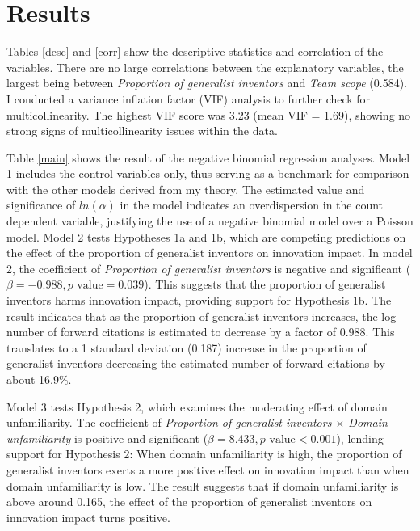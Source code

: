 \documentclass{article}
\begin{document}
\section{Results}

Tables \ref{desc} and \ref{corr} show the descriptive statistics and correlation of the variables. There are no large correlations between the explanatory variables, the largest being between \textit{Proportion of generalist inventors} and \textit{Team scope} (0.584). I conducted a variance inflation factor (VIF) analysis to further check for multicollinearity. The highest VIF score was 3.23 (mean VIF = 1.69), showing no strong signs of multicollinearity issues within the data.







Table \ref{main} shows the result of the negative binomial regression analyses. Model 1 includes the control variables only, thus serving as a benchmark for comparison with the other models derived from my theory. The estimated value and significance of $ln(\alpha)$ in the model indicates an overdispersion in the count dependent variable, justifying the use of a negative binomial model over a Poisson model. Model 2 tests Hypotheses 1a and 1b, which are competing predictions on the effect of the proportion of generalist inventors on innovation impact. In model 2, the coefficient of \textit{Proportion of generalist inventors} is negative and significant ($\beta = -0.988, p \text{ value} = 0.039$). This suggests that the proportion of generalist inventors harms innovation impact, providing support for Hypothesis 1b. The result indicates that as the proportion of generalist inventors increases, the log number of forward citations is estimated to decrease by a factor of 0.988. This translates to a 1 standard deviation (0.187) increase in the proportion of generalist inventors decreasing the estimated number of forward citations by about 16.9\%.

Model 3 tests Hypothesis 2, which examines the moderating effect of domain unfamiliarity. The coefficient of \textit{Proportion of generalist inventors $\times$ Domain unfamiliarity} is positive and significant ($\beta = 8.433, p \text{ value} < 0.001$), lending support for Hypothesis 2: When domain unfamiliarity is high, the proportion of generalist inventors exerts a more positive effect on innovation impact than when domain unfamiliarity is low. The result suggests that if domain unfamiliarity is above around 0.165, the effect of the proportion of generalist inventors on innovation impact turns positive.
\end{document}
